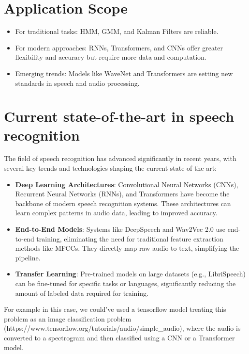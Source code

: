 \documentclass[informe,english]{practicaitic}
\begin{document}
    \section{Application Scope}
    \begin{itemize}
        \item For traditional tasks: HMM, GMM, and Kalman Filters are reliable.
        \item For modern approaches: RNNs, Transformers, and CNNs offer greater flexibility and accuracy but require more data and computation.
        \item Emerging trends: Models like WaveNet and Transformers are setting new standards in speech and audio processing.
    \end{itemize}
    
\section{Current state-of-the-art in speech recognition}
    The field of speech recognition has advanced significantly in recent years, with several key trends and technologies shaping the current state-of-the-art:

    \begin{itemize}
        \item \textbf{Deep Learning Architectures}: Convolutional Neural Networks (CNNs), Recurrent Neural Networks (RNNs), and Transformers have become the backbone of modern speech recognition systems. These architectures can learn complex patterns in audio data, leading to improved accuracy.
        
        \item \textbf{End-to-End Models}: Systems like DeepSpeech and Wav2Vec 2.0 use end-to-end training, eliminating the need for traditional feature extraction methods like MFCCs. They directly map raw audio to text, simplifying the pipeline.
        
        \item \textbf{Transfer Learning}: Pre-trained models on large datasets (e.g., LibriSpeech) can be fine-tuned for specific tasks or languages, significantly reducing the amount of labeled data required for training.
    \end{itemize}

    For example in this case, we could've used a tensorflow model treating this problem as an image classification problem (https://www.tensorflow.org/tutorials/audio/simple\_audio), where the audio is converted to a spectrogram and then classified using a CNN or a Transformer model. 
\end{document}
